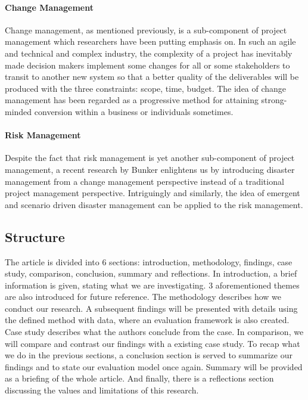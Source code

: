 \paragraph{Change Management}
Change management, as mentioned previously, is a sub-component of project management which researchers\parencite{3,6} have been putting emphasis on. In such an agile and technical and complex industry, the complexity of a project has inevitably made decision makers implement some changes for all or some stakeholders to transit to another new system\parencite[p. 1]{3} so that a better quality of the deliverables will be produced with the three constraints: scope, time, budget. The idea of change management has been regarded as a progressive method for attaining strong-minded conversion within a business or individuals sometimes\parencite[p. 3]{3}.

\paragraph{Risk Management}
Despite the fact that risk management is yet another sub-component of project management, a recent research by Bunker enlightens us by introducing disaster management from a change management perspective instead of a traditional project management perspective\parencite[p. 10]{6}. Intriguingly and similarly, the idea of emergent and scenario driven disaster management can be applied to the risk management.

\subsection{Structure}
The article is divided into 6 sections: introduction, methodology, findings, case study, comparison, conclusion, summary and reflections. In introduction, a brief information is given, stating what we are investigating. 3 aforementioned themes are also introduced for future reference. The methodology describes how we conduct our research. A subsequent findings will be presented with details using the defined method with data, where an evaluation framework is also created. Case study describes what the authors conclude from the case.  In comparison, we will compare and contrast our findings with a existing case study. To recap what we do in the previous sections, a conclusion section is served to summarize our findings and to state our evaluation model once again. Summary will be provided as a briefing of the whole article. And finally, there is a reflections section discussing the values and limitations of this research.

